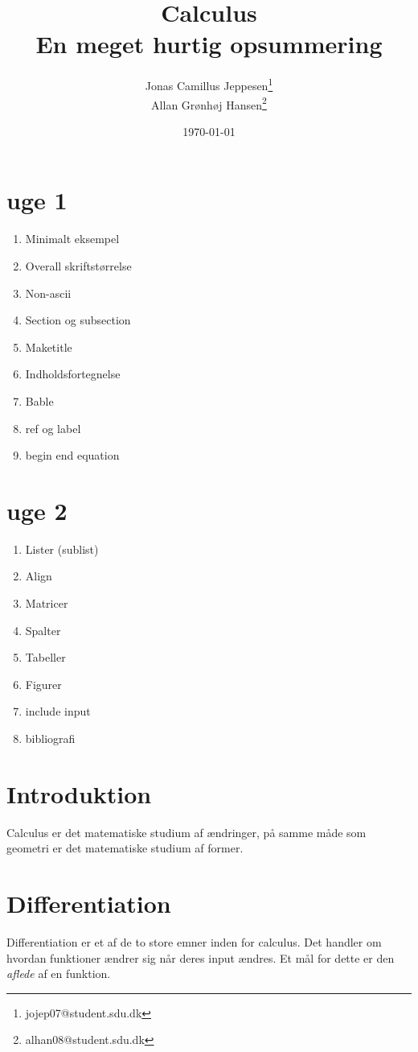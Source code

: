 \documentclass[a4paper, 12pt]{article}
\title{{\Huge Calculus}\\ En meget hurtig opsummering}
\date{\today}
\author{Jonas Camillus Jeppesen\thanks{jojep07@student.sdu.dk} \\
		Allan Grønhøj Hansen\thanks{alhan08@student.sdu.dk}}
\begin{document}
\maketitle
\newpage

\section{uge 1}
\begin{enumerate}
	\item Minimalt eksempel
	\item Overall skriftstørrelse
	\item Non-ascii
	\item Section og subsection
	\item Maketitle
	\item Indholdsfortegnelse
	\item Bable
	\item ref og label 
	\item begin end equation
\end{enumerate}

\section{uge 2}
\begin{enumerate}
	\item Lister (sublist)
	\item Align
	\item Matricer
	\item Spalter
	\item Tabeller
	\item Figurer
	\item include input
	\item bibliografi
\end{enumerate}
\newpage

\section{Introduktion}
Calculus er det matematiske studium af ændringer, på samme måde som geometri er det matematiske studium af former. 

\section{Differentiation}
Differentiation er et af de to store emner inden for calculus. Det handler om hvordan funktioner ændrer sig når deres input ændres. Et mål for dette er den \emph{aflede} af en funktion. 
\end{document}
